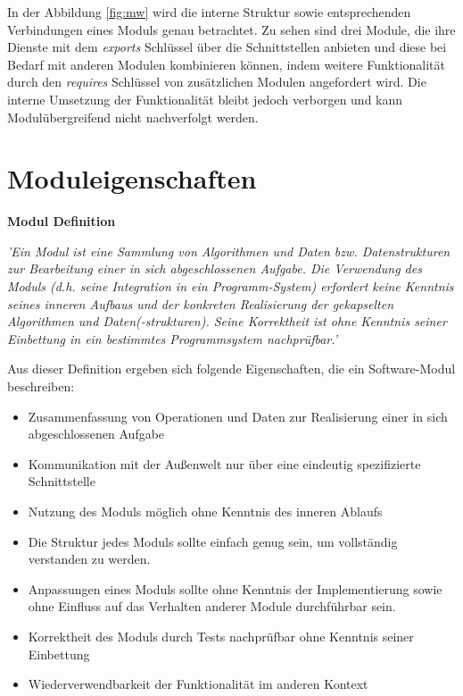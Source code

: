     In der Abbildung \ref{fig:mw} wird die interne Struktur sowie entsprechenden Verbindungen eines Moduls genau betrachtet. Zu sehen sind drei Module, die ihre Dienste mit dem \textit{exports} Schlüssel über die Schnittstellen anbieten und diese bei Bedarf mit anderen Modulen kombinieren können, indem weitere Funktionalität durch den \textit{requires} Schlüssel von zusätzlichen Modulen angefordert wird. Die interne Umsetzung der Funktionalität bleibt jedoch verborgen und kann Modulübergreifend nicht nachverfolgt werden. 

  \section{Moduleigenschaften} \label{sec:ME}

    \textbf{Modul Definition}
    \begin{displayquote}
    	\textit {'Ein Modul ist eine Sammlung von Algorithmen und Daten bzw. Datenstrukturen zur Bearbeitung einer in sich abgeschlossenen Aufgabe. Die Verwendung des Moduls (d.h. seine Integration in ein Programm-System) erfordert keine Kenntnis seines inneren Aufbaus und der konkreten Realisierung der gekapselten Algorithmen und Daten(-strukturen). Seine Korrektheit ist ohne Kenntnis seiner Einbettung in ein bestimmtes Programmsystem nachprüfbar.'} \cite{rechenberg2006informatik}
    \end{displayquote}\bigbreak 

    Aus dieser Definition ergeben sich folgende Eigenschaften, die ein Software-Modul beschreiben:

    \begin{itemize}
      \item Zusammenfassung von Operationen und Daten zur Realisierung einer in sich abgeschlossenen Aufgabe 
      \item Kommunikation mit der Außenwelt nur über eine eindeutig spezifizierte Schnittstelle 
      \item Nutzung des Moduls möglich ohne Kenntnis des inneren Ablaufs 
      \item Die Struktur jedes Moduls sollte einfach genug sein, um vollständig verstanden zu werden.
      \item Anpassungen eines Moduls sollte ohne Kenntnis der Implementierung sowie ohne Einfluss auf das Verhalten anderer Module durchführbar sein.
      \item Korrektheit des Moduls durch Tests nachprüfbar ohne Kenntnis seiner Einbettung
      \item Wiederverwendbarkeit der Funktionalität im anderen Kontext
    \end{itemize}

